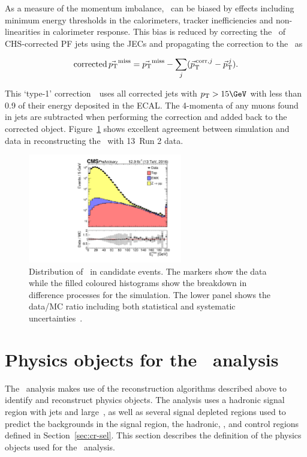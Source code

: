 As a measure of the momentum imbalance, \metvec~can be biased by effects including 
minimum energy thresholds in the calorimeters, tracker inefficiencies and non-linearities
in calorimeter response. This bias is reduced by correcting the \pt~of CHS-corrected PF jets 
using the JECs and propagating the correction to the \metvec~as

\begin{equation}
\text{corrected}\,\mbox{$\vec{{p_{\text T}}}^\text{miss}$} = \mbox{$\vec{{p_{\text T}}}^\text{miss}$} - \sum_{j}(\vec{p}^{\,\text{corr},j}_\text{T} -
\vec{p}_\text{T}^{\,j}).
\end{equation}

This `type-1' correction~\cite{met_fig}~uses all corrected jets with $\pt > 15\GeV$ with less than 0.9 of their energy deposited in the ECAL.
The 4-momenta of any muons found in jets are subtracted when performing the correction and added back to the corrected object.
Figure~\ref{fig:met_fig} shows excellent agreement between simulation and data
in reconstructing the \met~with 13\TeV~Run 2 data.

\begin{figure}
\centering
    \includegraphics[width=0.6\textwidth]{./Figures/reconstruction/met_fig.pdf}
  \caption{Distribution of \met~in \zmumu candidate events. The markers show the data while the filled coloured histograms
  show the breakdown in difference processes for the simulation. The lower panel shows the data/MC ratio including
  both statistical and systematic uncertainties~\cite{met_fig}. \label{fig:met_fig} 
}
\end{figure}

\section{Physics objects for the \alphat~analysis}

The \alphat~analysis makes use of the reconstruction algorithms described above
to identify and reconstruct physics objects. The analysis uses a hadronic signal 
region with jets and large~\met, as well as several signal depleted regions used to predict the
backgrounds in the signal region, the hadronic, \gj, \mj and \mmj control regions defined in 
Section~\ref{sec:cr-sel}. This section describes the definition of the 
physics objects used for the \alphat~analysis.

